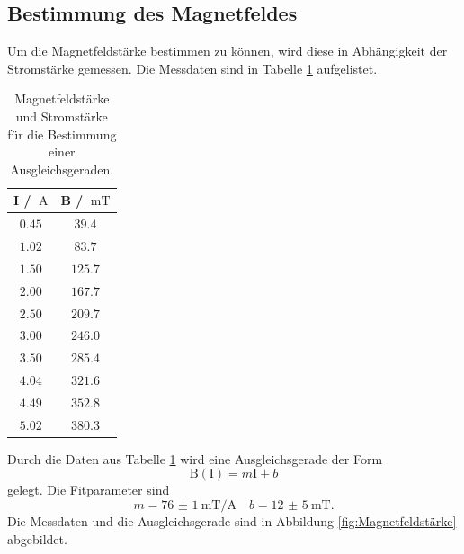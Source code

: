 \subsection{Bestimmung des Magnetfeldes}
Um die Magnetfeldstärke bestimmen zu können, wird diese in Abhängigkeit der Stromstärke gemessen. Die Messdaten
sind in Tabelle \ref{tab:Magnetfeldstärke} aufgelistet.
\FloatBarrier
\begin{table}
    \centering
    \caption{Magnetfeldstärke und Stromstärke für die Bestimmung einer Ausgleichsgeraden.}
    \label{tab:Magnetfeldstärke}
    \begin{tabular}{c c}
        \toprule
        I / $\SI{}{\ampere}$&B / $\SI{}{\milli\tesla}$\\
        \midrule
        $\num{0.45}$&$\num{39.4}$\\
        $\num{1.02}$&$\num{83.7}$\\
        $\num{1.50}$&$\num{125.7}$\\
        $\num{2.00}$&$\num{167.7}$\\
        $\num{2.50}$&$\num{209.7}$\\
        $\num{3.00}$&$\num{246.0}$\\
        $\num{3.50}$&$\num{285.4}$\\
        $\num{4.04}$&$\num{321.6}$\\
        $\num{4.49}$&$\num{352.8}$\\
        $\num{5.02}$&$\num{380.3}$\\
        \bottomrule
    \end{tabular}
\end{table}
\FloatBarrier
Durch die Daten aus Tabelle \ref{tab:Magnetfeldstärke} wird eine Ausgleichsgerade der Form
\begin{equation*}
    \text{B}(\text{I}) = m\text{I} +b
\end{equation*}
gelegt.
Die Fitparameter sind 
\begin{equation*}
    m = \SI{76(1)}{\milli\tesla\per\ampere} \quad b = \SI{12(5)}{\milli\tesla}.
\end{equation*}
Die Messdaten und die Ausgleichsgerade sind in Abbildung \ref{fig:Magnetfeldstärke} abgebildet.
\FloatBarrier
